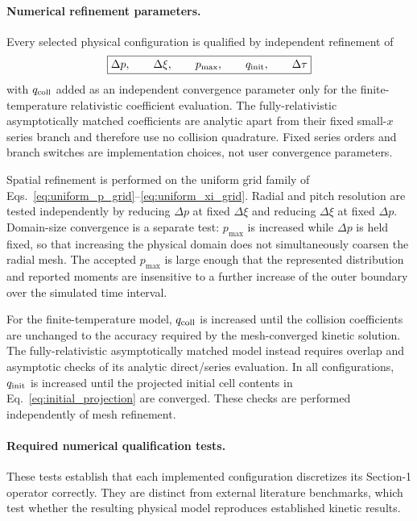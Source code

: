 \documentclass[11pt]{article}
\begin{document}
\paragraph{Numerical refinement parameters.}
Every selected physical configuration is qualified by independent refinement of
\begin{equation}
 \boxed{
 \Delta p,\qquad \Delta\xi,\qquad p_{\max},\qquad
 q_{\rm init},\qquad \Delta\tau
 }
 \label{eq:convergence_parameters}
\end{equation}
with $q_{\rm coll}$ added as an independent convergence parameter only for the
finite-temperature relativistic coefficient evaluation.  The fully-relativistic asymptotically matched coefficients are analytic apart
from their fixed small-$x$ series branch and therefore
use no collision quadrature.  Fixed series orders and branch switches are implementation
choices, not user convergence parameters.

Spatial refinement is performed on the uniform grid family of
Eqs.~\eqref{eq:uniform_p_grid}--\eqref{eq:uniform_xi_grid}.  Radial and pitch resolution
are tested independently by reducing $\Delta p$ at fixed $\Delta\xi$ and reducing
$\Delta\xi$ at fixed $\Delta p$.  Domain-size convergence is a separate test:
$p_{\max}$ is increased while $\Delta p$ is held fixed, so that increasing the physical
domain does not simultaneously coarsen the radial mesh.  The accepted $p_{\max}$ is
large enough that the represented distribution and reported moments are insensitive to
a further increase of the outer boundary over the simulated time interval.

For the finite-temperature model, $q_{\rm coll}$ is increased until the collision
coefficients are unchanged to the accuracy required by the mesh-converged kinetic
solution.  The fully-relativistic asymptotically matched model instead requires overlap and
asymptotic checks of its analytic direct/series evaluation.  In all configurations, $q_{\rm init}$ is increased
until the projected initial cell contents in Eq.~\eqref{eq:initial_projection} are
converged.  These checks are performed independently of mesh refinement.

\paragraph{Required numerical qualification tests.}
These tests establish that each implemented configuration discretizes its Section-1
operator correctly.  They are distinct from external literature benchmarks, which test
whether the resulting physical model reproduces established kinetic results.
\end{document}
